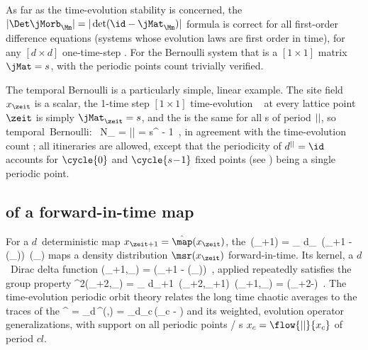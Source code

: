 As far as the time-evolution stability is concerned, the
$|\Det\jMorb_\Mm|=|\det (\id-\jMat_\Mm)|$ formula  is
correct for all first-order difference equations (systems whose evolution
laws are first order in time), for any $[d\times{d}]$ one-time-step
{\jacobianM}. For the Bernoulli system that is a $[1\!\times\!1]$ matrix
$\jMat=s$, with the periodic points count  trivially
verified.

The temporal {Bernoulli}  is a particularly simple, linear  example.
The site field $\ssp_\zeit$ is a scalar,
the 1-time step $[1\!\times\!1]$ time-evolution \jacobianM\
 at every lattice point $\zeit$ is simply
$\jMat_{\zeit}={s}$,
and
the {\jacobianOrb}
 is the same for all {\lattstate}s of period ${||}$,
so
\beq
\mbox{temporal {Bernoulli}: }\quad
N_\cl{} = |\Det\jMorb| = {s}^{\cl{}} - 1
\,,
in agreement with the time-evolution count ; all
itineraries are allowed, except that the periodicity of
$\shift^\cl{}=\id$ accounts for $\cycle{0}$ and
$\cycle{s\!-\!1}$ fixed points (see ) being a
single periodic point.



\subsection{{\HillDet} of a forward-in-time map}
\label{s:LC21forwardHill}

For a $d$\dmn\ deterministic map $\ssp_{\zeit+1} = \hat{\map}(\ssp_{\zeit})$, the
{\FPoper}
\beq
     \Lop\,\msr(\ssp_{\zeit+1})
= \int_\pS\!\! d\ssp_{\zeit}\,
           \delta(\ssp_{\zeit+1} - \hat{\map}(\ssp_{\zeit}))\,
           \msr(\ssp_{\zeit})
maps a density distribution $\msr(\ssp_{\zeit})$ forward-in-time.
Its kernel, a $d$\dmn\ Dirac delta function
\bea
\Lop(\ssp_{\zeit+1},\ssp_{\zeit})
    = \delta(\ssp_{\zeit+1} - \hat{\map}(\ssp_{\zeit}))
\,,
\eea
applied repeatedly satisfies the group property
\beq
\Lop^2(\ssp_{\zeit+2},\ssp_{\zeit})
    = \int_\pS\!\! d\ssp_{\zeit+1}\,
            \Lop(\ssp_{\zeit+2},\ssp_{\zeit+1})\,
            \Lop(\ssp_{\zeit+1},\ssp_{\zeit})
    = \delta(\ssp_{\zeit+2}-)
\,.
The time-evolution periodic orbit theory relates the
long time chaotic averages to the traces of the {\FPoper}
\beq
\tr\Lop^\cl{}
     = \int_\pS\!\!d\ssp\,\Lop^\cl{}(\ssp,\ssp)
     = \int_\pS\!\!d\ssp_{c}\,\delta(\ssp_{c} - )
\eeq
and its weighted, evolution operator generalizations, with support on all
periodic points / {\lattstate}s   $\ssp_{c}=\flow{\cl{}}{\ssp_c}$ of
period $cl{}$.

